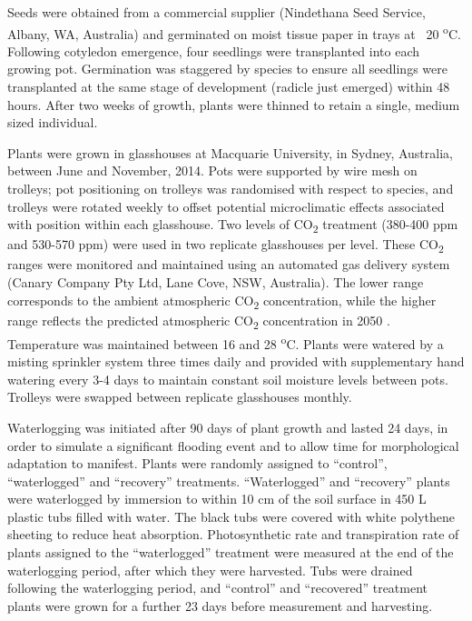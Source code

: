 \documentclass[12pt,a4paper]{memoir}
\begin{document}
Seeds were obtained from a commercial supplier (Nindethana Seed Service, Albany, WA, Australia) and germinated on moist tissue paper in trays at ~20 \textsuperscript{o}C. Following cotyledon emergence, four seedlings were transplanted into each growing pot. Germination was staggered by species to ensure all seedlings were transplanted at the same stage of development (radicle just emerged) within 48 hours. After two weeks of growth, plants were thinned to retain a single, medium sized individual.

Plants were grown in glasshouses at Macquarie University, in Sydney, Australia, between June and November, 2014. Pots were supported by wire mesh on trolleys; pot positioning on trolleys was randomised with respect to species, and trolleys were rotated weekly to offset potential microclimatic effects associated with position within each glasshouse. Two levels of CO\textsubscript{2} treatment (380-400 ppm and 530-570 ppm) were used in two replicate glasshouses per level. These CO\textsubscript{2} ranges were monitored and maintained using an automated gas delivery system (Canary Company Pty Ltd, Lane Cove, NSW, Australia). The lower range corresponds to the ambient atmospheric CO\textsubscript{2} concentration, while the higher range reflects the predicted atmospheric CO\textsubscript{2} concentration in 2050 \citep{IPCC2014}. Temperature was maintained between 16 and 28 \textsuperscript{o}C. Plants were watered by a misting sprinkler system three times daily and provided with supplementary hand watering every 3-4 days to maintain constant soil moisture levels between pots. Trolleys were swapped between replicate glasshouses monthly.

Waterlogging was initiated after 90 days of plant growth and lasted 24 days, in order to simulate a significant flooding event and to allow time for morphological adaptation to manifest. Plants were randomly assigned to “control”, “waterlogged” and “recovery” treatments. “Waterlogged” and “recovery” plants were waterlogged by immersion to within 10 cm of the soil surface in 450 L plastic tubs filled with water. The black tubs were covered with white polythene sheeting to reduce heat absorption. Photosynthetic rate and transpiration rate of plants assigned to the “waterlogged” treatment were measured at the end of the waterlogging period, after which they were harvested. Tubs were drained following the waterlogging period, and “control” and “recovered” treatment plants were grown for a further 23 days before measurement and harvesting.
\end{document}
